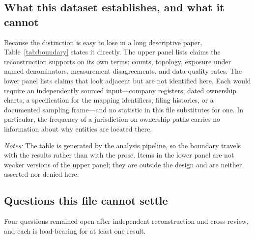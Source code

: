 \documentclass[11pt]{article}
\begin{document}
\subsection{What this dataset establishes, and what it cannot}

Because the distinction is easy to lose in a long descriptive paper,
Table~\ref{tab:boundary} states it directly. The upper panel lists claims the
reconstruction supports on its own terms: counts, topology, exposure under
named denominators, measurement disagreements, and data-quality rates. The
lower panel lists claims that look adjacent but are not identified here. Each
would require an independently sourced input---company registers, dated
ownership charts, a specification for the mapping identifiers, filing
histories, or a documented sampling frame---and no statistic in this file
substitutes for one. In particular, the frequency of a jurisdiction on
ownership paths carries no information about why entities are located there.

\begin{table}[tbp]
\centering
\caption{The evidence boundary of this study}
\label{tab:boundary}
\scriptsize

\begin{minipage}{0.94\textwidth}
\footnotesize\vspace{0.4em}
\textit{Notes:} The table is generated by the analysis pipeline, so the
boundary travels with the results rather than with the prose. Items in the
lower panel are not weaker versions of the upper panel; they are outside the
design and are neither asserted nor denied here.
\end{minipage}
\end{table}

\subsection{Questions this file cannot settle}

Four questions remained open after independent reconstruction and cross-review,
and each is load-bearing for at least one result.
\end{document}
